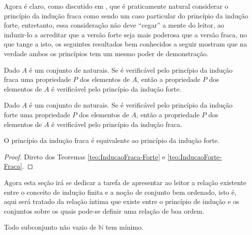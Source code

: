 Agora é claro, como discutido em \cite{carmo2013}, que é praticamente natural considerar o princípio da indução fraca como sendo um caso particular do  princípio da indução forte, entretanto, essa consideração não deve ``cegar'' a mente do leitor, ao induzir-lo a acreditar que a versão forte seja mais poderosa que a versão fraca, no que tange a isto, os seguintes resultados bem conhecidos a seguir mostram que na verdade ambos os princípios tem um mesmo poder de demonstração.

\begin{teorema}\label{teo:InducaoFraca-Forte}
	\cite{carmo2013} Dado $A$ é um conjunto de naturais. Se é verificável  pelo princípio da indução fraca uma propriedade $P$ dos elementos de $A$, então a propriedade $P$ dos elementos de $A$ é verificável pelo  princípio da indução forte.
\end{teorema}

\begin{teorema}\label{teo:InducaoForte-Fraca}
	\cite{carmo2013} Dado $A$ é um conjunto de naturais. Se é verificável  pelo princípio da indução forte uma propriedade $P$ dos elementos de $A$, então a propriedade $P$ dos elementos de $A$ é verificável pelo  princípio da indução fraca.
\end{teorema}

\begin{corolario}
	O princípio da indução fraca é equivalente ao princípio da indução forte.
\end{corolario}

\begin{proof}
	Direto dos Teoremas \ref{teo:InducaoFraca-Forte} e \ref{teo:InducaoForte-Fraca}.
\end{proof}

Agora esta seção irá se dedicar a tarefa de apresentar ao leitor a relação existente entre o conceito de indução finita e a noção de conjunto bem ordenado, isto é, aqui será tratado da relação íntima que existe entre o princípio de indução e os conjuntos sobre os quais pode-se definir uma relação de boa ordem.

\begin{teorema}\label{teo:InducaoBoaOrdem}
	Todo subconjunto não vazio de $\mathbb{N}$ tem mínimo.
\end{teorema}

